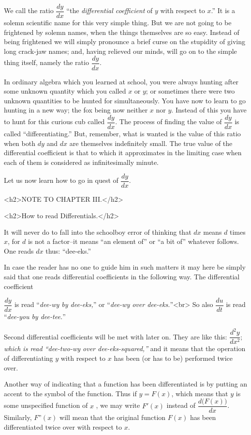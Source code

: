 \documentclass{ximera}
\begin{document}
We call the ratio $\dfrac{dy}{dx}$ “the \textit{differential coefficient} of $y$
with respect to $x$.” It is a solemn scientific name
for this very simple thing. But we are not going
to be frightened by solemn names, when the things
themselves are so easy. Instead of being frightened
we will simply pronounce a brief curse on the
stupidity of giving long crack-jaw names; and, having
relieved our minds, will go on to the simple thing
itself, namely the ratio $\dfrac{dy}{dx}$.


In ordinary algebra which you learned at school,
you were always hunting after some unknown
quantity which you called $x$ or $y$; or sometimes
there were two unknown quantities to be hunted
for simultaneously. You have now to learn to go
hunting in a new way; the fox being now neither
$x$ nor $y$. Instead of this you have to hunt for this
curious cub called $\dfrac{dy}{dx}$. The process of finding the
value of $\dfrac{dy}{dx}$ is called “differentiating.” But, remember,
what is wanted is the value of this ratio when both
$dy$ and $dx$ are themselves indefinitely small. The
true value of the differential coefficient is that to which
it approximates in the limiting case when each of
them is considered as infinitesimally minute.

Let us now learn how to go in quest of $\dfrac{dy}{dx}$.



<h2>NOTE TO CHAPTER III.</h2>

<h2>How to read Differentials.</h2>

It will never do to fall into the schoolboy error of
thinking that $dx$ means $d$ times $x$, for $d$ is not a
factor–it means “an element of” or “a bit of”
whatever follows. One reads $dx$ thus: “dee-eks.”

In case the reader has no one to guide him in such
matters it may here be simply said that one reads
differential coefficients in the following way. The
differential coefficient

$\dfrac{dy}{dx}$
is read “\textit{dee-wy by dee-eks,}” or “\textit{dee-wy over dee-eks.}”<br>
 So also
$\dfrac{du}{dt}$ is read “\textit{dee-you by dee-tee.}”


Second differential coefficients will be met with
later on. They are like this: $\dfrac{d^2 y}{dx^2};$
\textit{which is read “dee-two-wy over dee-eks-squared,”}
and it means that the operation of differentiating $y$
with respect to $x$ has been (or has to be) performed
twice over.

Another way of indicating that a function has been
differentiated is by putting an accent to the symbol of
the function. Thus if $y=F(x)$, which means that $y$
is some unspecified function of $x$ 
, we may
write $F'(x)$ instead of $\dfrac{d\bigl(F(x)\bigr)}{dx}$. Similarly, $F”(x)$
will mean that the original function $F(x)$ has been
differentiated twice over with respect to $x$.
\end{document}
